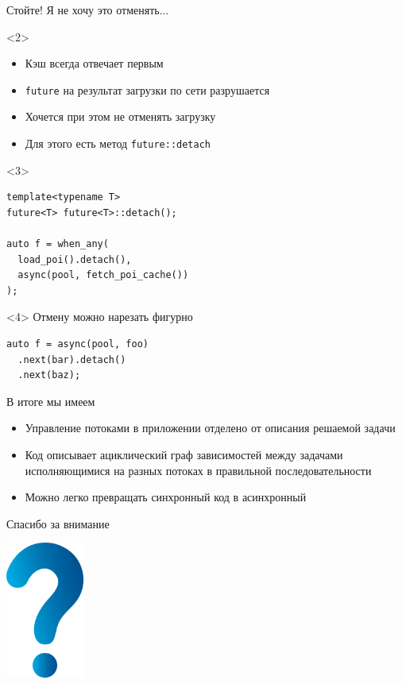 \documentclass[aspectratio=169,hyperref={unicode},17pt]{beamer}
\begin{document}
\begin{frame}[fragile,t]{Стойте! Я не хочу это отменять...}
\begin{onlyenv}<2>
\begin{itemize}
 \item Кэш всегда отвечает первым
 \item \texttt{future} на результат загрузки по сети разрушается
 \item Хочется при этом не отменять загрузку
 \item Для этого есть метод \texttt{future::detach}
\end{itemize}
\end{onlyenv}
\begin{onlyenv}<3>
\begin{lstlisting}[style=cppcode]
template<typename T>
future<T> future<T>::detach();

auto f = when_any(
  load_poi().detach(),
  async(pool, fetch_poi_cache())
);
\end{lstlisting}
\end{onlyenv}
\begin{onlyenv}<4>
Отмену можно нарезать фигурно
\begin{lstlisting}[style=cppcode]
auto f = async(pool, foo)
  .next(bar).detach()
  .next(baz);
\end{lstlisting}
\end{onlyenv}
\end{frame}

\begin{frame}[fragile,t]{В итоге мы имеем}
\begin{itemize}[<+->]
 \item Управление потоками в приложении отделено от описания решаемой задачи
 \item Код описывает ациклический граф зависимостей между задачами исполняющимися на разных потоках в правильной последовательности
 \item Можно легко превращать синхронный код в асинхронный
\end{itemize}
\end{frame}

\begin{frame}{Спасибо за внимание}
\centerline{\includegraphics[height=4.5cm]{question_mark_blue.png}}
\end{frame}
\end{document}
